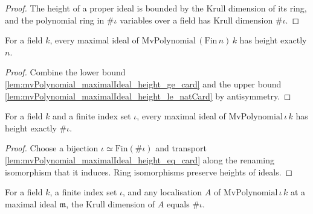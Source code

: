 \begin{proof}
  The height of a proper ideal is bounded by the Krull dimension of its
  ring, and the polynomial ring in \(\#\iota\) variables over a field has
  Krull dimension \(\#\iota\).
\end{proof}

\begin{lemma}
  \label{lem:mvPolynomial_maximalIdeal_height_eq_card}
  For a field \(k\), every maximal ideal of
  \(\mathrm{MvPolynomial}\,(\mathrm{Fin}\,n)\,k\) has height exactly \(n\).
\end{lemma}

\begin{proof}
  Combine the lower bound
  \cref{lem:mvPolynomial_maximalIdeal_height_ge_card} and the upper bound
  \cref{lem:mvPolynomial_maximalIdeal_height_le_natCard} by antisymmetry.
\end{proof}

\begin{lemma}
  \label{lem:mvPolynomial_maximalIdeal_height_eq_natCard}
  For a field \(k\) and a finite index set \(\iota\), every maximal ideal of
  \(\mathrm{MvPolynomial}\,\iota\,k\) has height exactly \(\#\iota\).
\end{lemma}

\begin{proof}
  Choose a bijection \(\iota \simeq \mathrm{Fin}(\#\iota)\) and transport
  \cref{lem:mvPolynomial_maximalIdeal_height_eq_card} along the renaming isomorphism
  that it induces. Ring isomorphisms preserve heights of ideals.
\end{proof}

\begin{lemma}
  \label{lem:ringKrullDim_localization_atMaximal_mvPolynomial}
  For a field \(k\), a finite index set \(\iota\), and any localisation \(A\) of
  \(\mathrm{MvPolynomial}\,\iota\,k\) at a maximal ideal \(\mathfrak m\), the Krull
  dimension of \(A\) equals \(\#\iota\).
\end{lemma}

